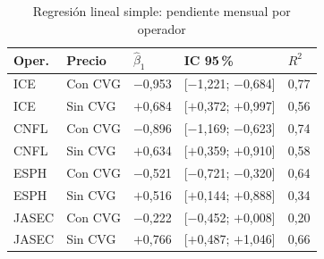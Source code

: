 \begin{table}[htbp]
\caption{Regresi\'on lineal simple: pendiente mensual por operador}
\label{tab:reg-simple}
\centering
\scriptsize
\renewcommand{\arraystretch}{1.15}
\begin{tabular}{@{}p{0.95cm} p{1.3cm} p{1.1cm} p{2.3cm} p{0.7cm}@{}}
\hline
\textbf{Oper.} & \textbf{Precio} & \textbf{$\hat\beta_1$} & \textbf{IC 95\,\%} & \textbf{$R^2$} \\
\hline
ICE & Con CVG & $-$0,953 & [$-$1,221; $-$0,684] & 0,77 \\
ICE & Sin CVG & $+$0,684 & [$+$0,372; $+$0,997] & 0,56 \\
CNFL & Con CVG & $-$0,896 & [$-$1,169; $-$0,623] & 0,74 \\
CNFL & Sin CVG & $+$0,634 & [$+$0,359; $+$0,910] & 0,58 \\
ESPH & Con CVG & $-$0,521 & [$-$0,721; $-$0,320] & 0,64 \\
ESPH & Sin CVG & $+$0,516 & [$+$0,144; $+$0,888] & 0,34 \\
JASEC & Con CVG & $-$0,222 & [$-$0,452; $+$0,008] & 0,20 \\
JASEC & Sin CVG & $+$0,766 & [$+$0,487; $+$1,046] & 0,66 \\
\hline
\end{tabular}
\end{table}
\FloatBarrier
